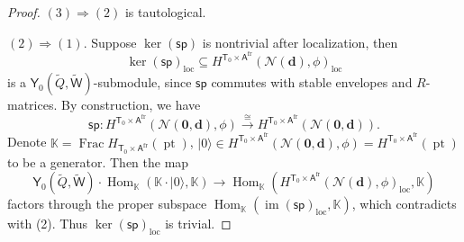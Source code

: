 \documentclass[10pt]{amsart}
\theoremstyle{definition}
\numberwithin{equation}{section}
\newcommand{\bK}{\mathbb{K}}
\newcommand{\bd}{\mathbf{d}}
\newcommand{\cN}{\mathcal{N}}
\newcommand{\loc}{\mathrm{loc}}
\newcommand{\sA}{\mathsf{A}}
\newcommand{\sT}{\mathsf{T}}
\newcommand{\sW}{\mathsf{W}}
\newcommand{\Frac}{\operatorname{Frac}}
\newcommand{\Hom}{\operatorname{Hom}}
\newcommand{\im}{\operatorname{im}}
\newcommand{\pt}{\operatorname{pt}}
\begin{document}
\begin{proof}
$(3)\Longrightarrow(2)$ is tautological. 

$(2)\Longrightarrow(1)$. Suppose $\ker(\mathsf{sp})$ is nontrivial after localization, then $$\ker(\mathsf{sp})_\loc \subseteq H^{\sT_0\times \sA^{\mathrm{fr}}}(\cN(\bd),\phi)_\loc$$ is a $\mathsf Y_0(\widetilde Q,\widetilde{\sW})$-submodule, since $\mathsf{sp}$ commutes with stable envelopes and $R$-matrices. By construction, we have $$\mathsf{sp}\colon H^{\sT_0\times \sA^{\mathrm{fr}}}(\cN(\mathbf 0,\bd),\phi)\xrightarrow{\cong}  H^{\sT_0\times \sA^{\mathrm{fr}}}(\cN(\mathbf 0,\bd)).$$ Denote $\bK=\Frac H_{\sT_0\times \sA^{\mathrm{fr}}}(\pt)$, $|0\rangle\in H^{\sT_0\times \sA^{\mathrm{fr}}}(\cN(\mathbf 0,\bd),\phi)=H^{\sT_0\times \sA^{\mathrm{fr}}}(\pt)$ to be a generator. Then the map $$\mathsf Y_0(\widetilde Q,\widetilde{\sW})\cdot\Hom_{\bK}(\bK\cdot |0\rangle,\bK)\to \Hom_{\bK}(H^{\sT_0\times \sA^{\mathrm{fr}}}(\cN(\bd),\phi)_\loc,\bK)$$ factors through the proper subspace $\Hom_{\bK}(\im(\mathsf{sp})_\loc,\bK)$, which contradicts with (2). Thus $\ker(\mathsf{sp})_\loc$ is trivial.


\end{proof}
\end{document}

